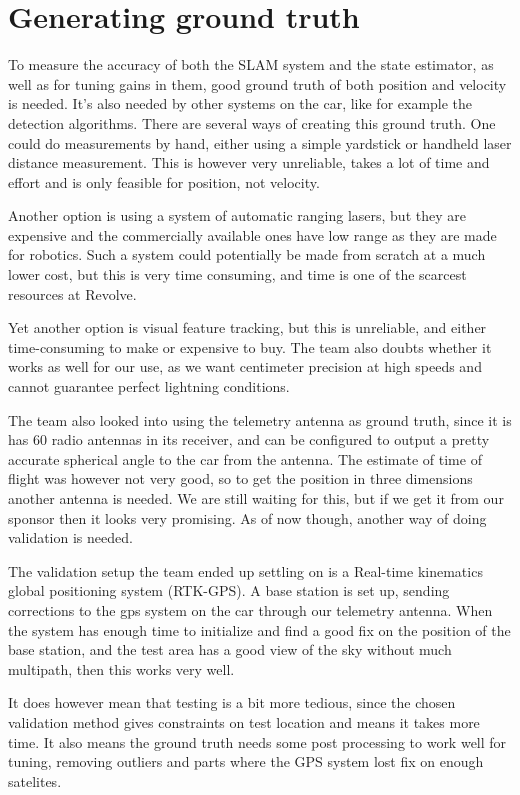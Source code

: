 \section{Generating ground truth}

To measure the accuracy of both the SLAM system and the state estimator, as well as for tuning gains in them, good ground truth of both position and velocity is needed. It's also needed by other systems on the car, like for example the detection algorithms. There are several ways of creating this ground truth. One could do measurements by hand, either using a simple yardstick or handheld laser distance measurement. This is however very unreliable, takes a lot of time and effort and is only feasible for position, not velocity.

Another option is using a system of automatic ranging lasers, but they are expensive and the commercially available ones have low range as they are made for robotics. Such a system could potentially be made from scratch at a much lower cost, but this is very time consuming, and time is one of the scarcest resources at Revolve. 

Yet another option is visual feature tracking, but this is unreliable, and either time-consuming to make or expensive to buy. The team also doubts whether it works as well for our use, as we want centimeter precision at high speeds and cannot guarantee perfect lightning conditions. 

The team also looked into using the telemetry antenna as ground truth, since it is has $60$ radio antennas in its receiver, and can be configured to output a pretty accurate spherical angle to the car from the antenna. The estimate of time of flight was however not very good, so to get the position in three dimensions another antenna is needed. We are still waiting for this, but if we get it from our sponsor then it looks very promising. As of now though, another way of doing validation is needed. 

The validation setup the team ended up settling on is a Real-time kinematics global positioning system (RTK-GPS). A base station is set up, sending corrections to the gps system on the car through our telemetry antenna. When the system has enough time to initialize and find a good fix on the position of the base station, and the test area has a good view of the sky without much multipath, then this works very well. 

It does however mean that testing is a bit more tedious, since the chosen validation method gives constraints on test location and means it takes more time. It also means the ground truth needs some post processing to work well for tuning, removing outliers and parts where the GPS system lost fix on enough satelites.